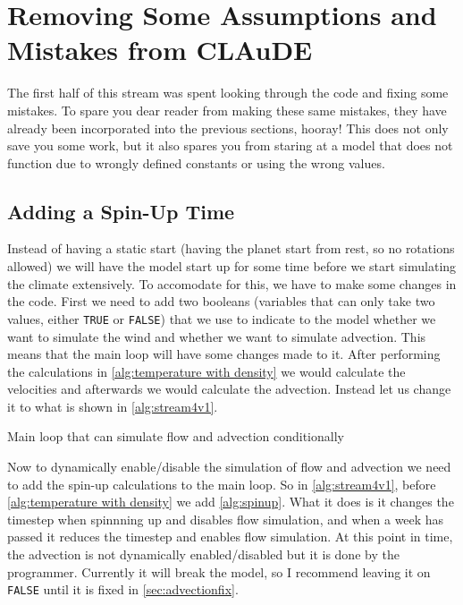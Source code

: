 \section{Removing Some Assumptions and Mistakes from CLAuDE}
The first half of this stream was spent looking through the code and fixing some mistakes. To spare you dear reader from making these same mistakes, they have already been incorporated into 
the previous sections, hooray! This does not only save you some work, but it also spares you from staring at a model that does not function due to wrongly defined constants or using the wrong 
values.

\subsection{Adding a Spin-Up Time}
Instead of having a static start (having the planet start from rest, so no rotations allowed) we will have the model start up for some time before we start simulating the climate extensively.
To accomodate for this, we have to make some changes in the code. First we need to add two booleans (variables that can only take two values, either \texttt{TRUE} or \texttt{FALSE}) that we use
to indicate to the model whether we want to simulate the wind and whether we want to simulate advection. This means that the main loop will have some changes made to it. After performing the 
calculations in \autoref{alg:temperature with density} we would calculate the velocities and afterwards we would calculate the advection. Instead let us change it to what is shown in 
\autoref{alg:stream4v1}.

\begin{algorithm}
    \caption{Main loop that can simulate flow and advection conditionally}
    \label{alg:stream4v1}
\end{algorithm}

Now to dynamically enable/disable the simulation of flow and advection we need to add the spin-up calculations to the main loop. So in \autoref{alg:stream4v1}, before 
\autoref{alg:temperature with density} we add \autoref{alg:spinup}. What it does is it changes the timestep when spinnning up and disables flow simulation, and when a week has passed it reduces 
the timestep and enables flow simulation. At this point in time, the advection is not dynamically enabled/disabled but it is done by the programmer. Currently it will break the model, so I 
recommend leaving it on \texttt{FALSE} until it is fixed in \autoref{sec:advectionfix}.

